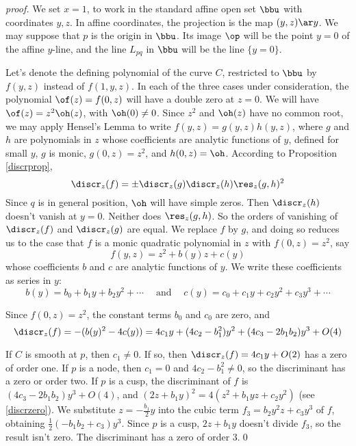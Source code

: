 \documentclass[leqno]{book}
\theoremstyle{definition}%
\numberwithin{equation}{section}
\theoremstyle{theorem} %
\renewenvironment{proof}{\no \emph{proof.}}{}
\begin{document}
\begin{proof}
 We
set $x=1$, to work in the standard affine open set $\bbu$ with
coordinates $y,z$.  In affine coordinates, the projection is the map
$(y,z) \ar y$.  We may suppose that $p$ is the origin in $\bbu$.  Its
image $\op$  will be the point $y=0$ of the affine $y$-line, and the line
$L_{pq}$  in $\bbu$ will be the line $\{y=0\}$.

 Let's denote the defining polynomial of the curve $C$, restricted to
 $\bbu$ by $f(y,z)$ instead of $f(1,y,z)$.  In each of the three cases
 under consideration, the polynomial $\of(z) = f(0,z)$ will have a
 double zero at $z=0$.  We will have $\of(z) = z^2\oh(z)$, with
 $\oh(0) \neq 0$.  Since $z^2$ and $\oh(z)$ have no common root, we may
 apply Hensel's Lemma to write $f(y,z) = g(y,z)h(y,z)$, where $g$ and
 $h$ are polynomials in $z$ whose coefficients are analytic functions
 of $y$, defined for small $y$,  $g$ is monic, $g(0,z) = z^2$,
 and $h(0,z) = \oh$.  According to Proposition
 \ref{discrprop}, $$\discr_z(f) =
 \pm\discr_z(g)\discr_z(h)\res_z(g,h)^2$$ Since $q$ is in
 general position, $\oh$ will have simple zeros.  Then $\discr_z(h)$
 doesn't vanish at $y=0$.  Neither does $\res_z(g,h)$.  So the
 orders of vanishing of $\discr_z(f)$ and $\discr_z(g)$ are equal.  We
 replace $f$ by $g$, and doing so reduces us to the case that $f$ is a
 monic quadratic polynomial in $z$ with $f(0,z)=z^2$, say
$$f(y,z) = z^2+b(y)z+c(y)$$ whose coefficients $b$ and $c$ are
analytic functions of $y$.  We write these coefficients as series in
$y$:
$$b(y) = b_0+b_1y+ b_2y^2+\cdots\quad\;\text{and}\quad\; c(y) = c_0+c_1y+
c_2y^2+c_3y^3 +\cdots$$

\no
Since $f(0,z)=z^2$, the constant terms $b_0$ and $c_0$ are zero, and 
$$\discr_z(f) = -(b(y)^2-4c(y)) = 4c_1y + (4c_2-b_1^2)y^2 +
(4c_3-2b_1b_2)y^3 + O(4)$$

\no If $C$ is smooth at $p$, then $c_1 \neq 0$.  If so, then
$\discr_z(f) = 4 c_1y + O(2)$ has a zero of order one.  If $p$ is a
node, then $c_1=0$ and $4c_2-b_1^2 \neq 0$, so the discriminant has a
zero or order two.  If $p$ is a cusp, the discriminant of $f$ is
$(4c_3-2b_1b_2)y^3+ O(4)$, and $(2z+b_1y)^2 = 4(z^2+b_1yz+c_2y^2)$
(see \ref{discrzero}).  We substitute $z = -\frac {b_1}2 y$ into the
cubic term $f_3=b_2y^2z+c_3y^3$ of $f$, obtaining $\frac 1 2 (-b_1b_2
+ c_3)y^3$.  Since $p$ is a cusp, $2z+b_1y$ doesn't divide $f_3$, so
the result isn't zero.  The discriminant has a zero of order
$3$.\qed\end{proof}
\end{document}
